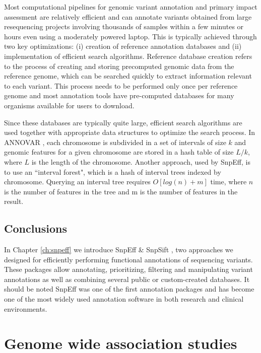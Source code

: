 Most computational pipelines for genomic variant annotation and primary impact assessment are relatively efficient and can annotate variants obtained from large resequencing projects involving thousands of samples within a few minutes or hours even using a moderately powered laptop. This is typically achieved through two key optimizations: (i) creation of reference annotation databases and (ii) implementation of efficient search algorithms. Reference database creation refers to the process of creating and storing precomputed genomic data from the reference genome, which can be searched quickly to extract information relevant to each variant. This process needs to be performed only once per reference genome and most annotation tools have pre-computed databases for many organisms available for users to download.

Since these databases are typically quite large, efficient search algorithms are used together with appropriate data structures to optimize the search process. In ANNOVAR \cite{wang2010annovar}, each chromosome is subdivided in a set of intervals of size $k$ and genomic features for a given chromosome are stored in a hash table of size $L/k$, where $L$ is the length of the chromosome. Another approach, used by SnpEff, is to use an ``interval forest", which is a hash of interval trees  \cite{cormen2001introduction} indexed by chromosome. Querying an interval tree requires $O[log(n) + m]$ time, where $n$ is the number of features in the tree and m is the number of features in the result. 

\subsection{Conclusions}

In Chapter \ref{ch:snpeff} we introduce SnpEff \cite{cingolani2012program} \& SnpSift \cite{cingolani2012using}, two approaches we designed for efficiently performing functional annotations of sequencing variants. These packages allow annotating, prioritizing, filtering and manipulating variant annotations as well as combining several public or custom-created databases. It should be noted SnpEff was one of the first annotation packages and has become one of the most widely used annotation software in both research and clinical environments. 

\section{Genome wide association studies}

